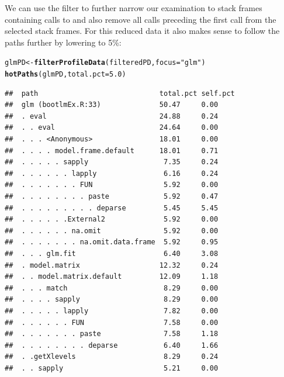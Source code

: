 \documentclass[nojss]{jss}\usepackage[]{graphicx}\usepackage[]{color}
\makeatletter
\newcommand{\hlnum}[1]{\textcolor[rgb]{0.686,0.059,0.569}{#1}}%
\newcommand{\hlstr}[1]{\textcolor[rgb]{0.192,0.494,0.8}{#1}}%
\newcommand{\hlstd}[1]{\textcolor[rgb]{0.345,0.345,0.345}{#1}}%
\newcommand{\hlkwb}[1]{\textcolor[rgb]{0.69,0.353,0.396}{#1}}%
\newcommand{\hlkwc}[1]{\textcolor[rgb]{0.333,0.667,0.333}{#1}}%
\newcommand{\hlkwd}[1]{\textcolor[rgb]{0.737,0.353,0.396}{\textbf{#1}}}%
\newenvironment{kframe}{%
 \def\at@end@of@kframe{}%
 \ifinner\ifhmode%
  \def\at@end@of@kframe{\end{minipage}}%
  \begin{minipage}{\columnwidth}%
 \fi\fi%
 \def\FrameCommand##1{\hskip\@totalleftmargin \hskip-\fboxsep
 \colorbox{shadecolor}{##1}\hskip-\fboxsep
     \hskip-\linewidth \hskip-\@totalleftmargin \hskip\columnwidth}%
 \MakeFramed {\advance\hsize-\width
   \@totalleftmargin\z@ \linewidth\hsize
   \@setminipage}}%
 {\par\unskip\endMakeFramed%
 \at@end@of@kframe}
\newenvironment{knitrout}{}{} %
\makeatother
\begin{document}
We can use the  filter to further narrow our examination
to stack frames containing calls to  and also remove all
calls preceding the first  call from the selected stack
frames. For this reduced data it also makes sense to follow the paths
further by lowering  to 5\%:
\begin{knitrout}\small
{}\color{fgcolor}\begin{kframe}
\begin{alltt}
\hlstd{glmPD} \hlkwb{<-} \hlkwd{filterProfileData}\hlstd{(filteredPD,} \hlkwc{focus} \hlstd{=} \hlstr{"glm"}\hlstd{)}
\hlkwd{hotPaths}\hlstd{(glmPD,} \hlkwc{total.pct} \hlstd{=} \hlnum{5.0}\hlstd{)}
\end{alltt}
\begin{verbatim}
##  path                             total.pct self.pct
##  glm (bootlmEx.R:33)              50.47     0.00    
##  . eval                           24.88     0.24    
##  . . eval                         24.64     0.00    
##  . . . <Anonymous>                18.01     0.00    
##  . . . . model.frame.default      18.01     0.71    
##  . . . . . sapply                  7.35     0.24    
##  . . . . . . lapply                6.16     0.24    
##  . . . . . . . FUN                 5.92     0.00    
##  . . . . . . . . paste             5.92     0.47    
##  . . . . . . . . . deparse         5.45     5.45    
##  . . . . . .External2              5.92     0.00    
##  . . . . . . na.omit               5.92     0.00    
##  . . . . . . . na.omit.data.frame  5.92     0.95    
##  . . . glm.fit                     6.40     3.08    
##  . model.matrix                   12.32     0.24    
##  . . model.matrix.default         12.09     1.18    
##  . . . match                       8.29     0.00    
##  . . . . sapply                    8.29     0.00    
##  . . . . . lapply                  7.82     0.00    
##  . . . . . . FUN                   7.58     0.00    
##  . . . . . . . paste               7.58     1.18    
##  . . . . . . . . deparse           6.40     1.66    
##  . .getXlevels                     8.29     0.24    
##  . . sapply                        5.21     0.00
\end{verbatim}
\end{kframe}
\end{knitrout}
\end{document}
